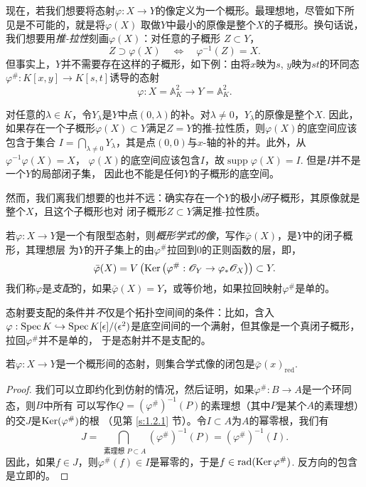 现在，若我们想要将态射$\varphi:X\to Y$的像定义为一个概形。最理想地，尽管如下所见是不可能的，就是将$\varphi(X)$
取做$Y$中最小的原像是整个$X$的子概形。换句话说，我们想要用\textit{推-拉性}刻画$\varphi(X)$：对任意的子概形
$Z\subset Y$，
\[
    Z \supset \varphi(X) \quad \Longleftrightarrow \quad \varphi^{-1}(Z)=X.
\]
但事实上，$Y$并不需要存在这样的子概形，如下例：由将$x$映为$s$, $y$映为$st$的环同态
$\varphi^{\#}: K[x, y] \rightarrow K[s, t]$诱导的态射
\[
    \varphi: X=\mathbb{A}_K^2 \longrightarrow Y=\mathbb{A}_K^2.
\]



对任意的$\lambda\in K$，令$Y_\lambda$是$Y$中点$(0,\lambda)$的补。对$\lambda \neq 0$，$Y_\lambda$的原像是整个$X$.
因此，如果存在一个子概形$\varphi(X)\subset Y$满足$Z=Y$的推-拉性质，则$\varphi(X)$的底空间应该包含于集合
$I=\bigcap_{\lambda\neq 0}Y_\lambda$，其是点$(0,0)$与$x$-轴的补的并。此外，从$\varphi^{-1}\varphi(X)=X$，
$\varphi(X)$的底空间应该包含$I$，故$\operatorname{supp}\varphi(X)=I$. 但是$I$并不是一个$Y$的局部闭子集，
因此也不能是任何$Y$的子概形的底空间。

然而，我们离我们想要的也并不远：确实存在一个$Y$的极小\textit{闭}子概形，其原像就是整个$X$，且这个子概形也对
闭子概形$Z\subset Y$满足推-拉性质。

\begin{defi}\label{defi:5.2}
若$\varphi:X\to Y$是一个有限型态射，则\textit{概形学式的像}，写作$\bar\varphi(X)$，是$Y$中的闭子概形，其理想层
为$Y$的开子集上的由$\varphi^\#$拉回到$0$的正则函数的层，即，
\[
    \bar{\varphi}(X)=V\left(\operatorname{Ker}
    \left(\varphi^{\#}: \mathscr{O}_Y \rightarrow \varphi_* \mathscr{O}_X\right)\right) \subset Y.
\]
我们称$\varphi$是\textit{支配}的，如果$\bar\varphi(X)=Y$，或等价地，如果拉回映射$\varphi^\#$是单的。
\end{defi}

态射要支配的条件并\textit{不}仅是个拓扑空间间的条件：比如，含入$\varphi:\operatorname{Spec} K\hookrightarrow 
\operatorname{Spec} K[\epsilon]/(\epsilon^2)$是底空间间的一个满射，但其像是一个真闭子概形，拉回$\varphi^\#$并不是单的，
于是态射并不是支配的。

\begin{pro}\label{pro:5.3}
若$\varphi:X\to Y$是一个概形间的态射，则集合学式像的闭包是$\bar\varphi(x)_{\text{red}}$.
\end{pro}

\begin{proof}
我们可以立即约化到仿射的情况，然后证明，如果$\varphi^\#:B\to A$是一个环同态，则$B$中所有
可以写作$Q=(\varphi^\#)^{-1}(P)$的素理想（其中$P$是某个$A$的素理想）的交$J$是$\operatorname{Ker}(\varphi^\#)$的根
（见第 \ref{s:1.2.1} 节）。令$I\subset A$为$A$的幂零根，我们有 
\[
    J=\bigcap_{\text { 素理想 } P \subset A}\left(\varphi^{\#}\right)^{-1}(P)=\left(\varphi^{\#}\right)^{-1}(I) .
\]
因此，如果$f\in J$，则$\varphi^\#(f)\in I$是幂零的，于是$f\in \operatorname{rad}(\operatorname{Ker} \varphi^\#)$. 反方向的包含
是立即的。
\end{proof}

